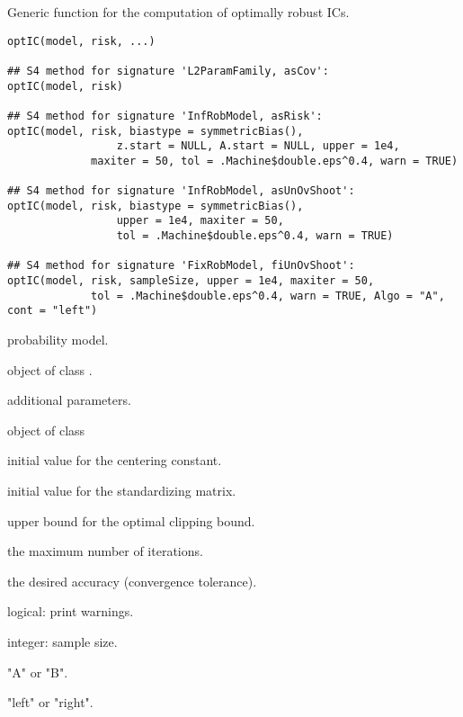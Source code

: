 \begin{Description}\relax
Generic function for the computation of optimally robust ICs.
\end{Description}
\begin{Usage}
\begin{verbatim}
optIC(model, risk, ...)

## S4 method for signature 'L2ParamFamily, asCov':
optIC(model, risk)

## S4 method for signature 'InfRobModel, asRisk':
optIC(model, risk, biastype = symmetricBias(), 
                 z.start = NULL, A.start = NULL, upper = 1e4, 
             maxiter = 50, tol = .Machine$double.eps^0.4, warn = TRUE)

## S4 method for signature 'InfRobModel, asUnOvShoot':
optIC(model, risk, biastype = symmetricBias(), 
                 upper = 1e4, maxiter = 50, 
                 tol = .Machine$double.eps^0.4, warn = TRUE)

## S4 method for signature 'FixRobModel, fiUnOvShoot':
optIC(model, risk, sampleSize, upper = 1e4, maxiter = 50, 
             tol = .Machine$double.eps^0.4, warn = TRUE, Algo = "A", cont = "left")
\end{verbatim}
\end{Usage}
\begin{Arguments}
\begin{ldescription}
\item[\code{model}] probability model. 
\item[\code{risk}] object of class . 
\item[\code{...}] additional parameters. 
\item[\code{biastype}] object of class  
\item[\code{z.start}] initial value for the centering constant. 
\item[\code{A.start}] initial value for the standardizing matrix. 
\item[\code{upper}] upper bound for the optimal clipping bound. 
\item[\code{maxiter}] the maximum number of iterations. 
\item[\code{tol}] the desired accuracy (convergence tolerance).
\item[\code{warn}] logical: print warnings. 
\item[\code{sampleSize}] integer: sample size. 
\item[\code{Algo}] "A" or "B". 
\item[\code{cont}] "left" or "right". 
\end{ldescription}
\end{Arguments}
